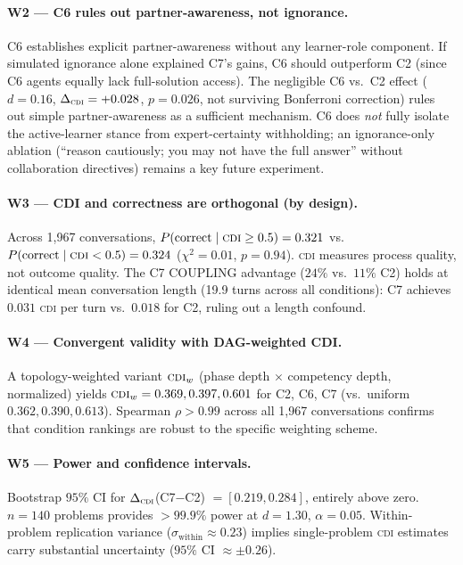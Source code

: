 \documentclass{article}
\newcommand{\CDI}{\textsc{cdi}}
\begin{document}
\paragraph{W2 — C6 rules out partner-awareness, not ignorance.}
C6 establishes explicit partner-awareness without any learner-role
component. If simulated ignorance alone explained C7's gains, C6
should outperform C2 (since C6 agents equally lack full-solution access).
The negligible C6 vs.\ C2 effect ($d=0.16$, $\Delta_{\CDI}=+0.028$,
$p=0.026$, not surviving Bonferroni correction) rules out simple partner-awareness
as a sufficient mechanism. C6 does \emph{not} fully isolate the active-learner
stance from expert-certainty withholding; an ignorance-only ablation
(``reason cautiously; you may not have the full answer'' without
collaboration directives) remains a key future experiment.

\paragraph{W3 — CDI and correctness are orthogonal (by design).}
Across 1,967 conversations, $P(\text{correct} \mid \CDI \geq 0.5)
= 0.321$ vs.\ $P(\text{correct} \mid \CDI < 0.5) = 0.324$
($\chi^2 = 0.01$, $p = 0.94$). \CDI{} measures process quality, not
outcome quality. The C7 COUPLING advantage ($24\%$ vs.\ $11\%$ C2)
holds at identical mean conversation length (19.9 turns across all
conditions): C7 achieves $0.031$ \CDI{} per turn vs.\ $0.018$ for C2,
ruling out a length confound.

\paragraph{W4 — Convergent validity with DAG-weighted CDI.}
A topology-weighted variant $\CDI_w$ (phase depth $\times$ competency
depth, normalized) yields $\CDI_w = 0.369, 0.397, 0.601$ for C2, C6,
C7 (vs.\ uniform $0.362, 0.390, 0.613$). Spearman $\rho > 0.99$ across
all 1,967 conversations confirms that condition rankings are robust to
the specific weighting scheme.

\paragraph{W5 — Power and confidence intervals.}
Bootstrap $95\%$ CI for $\Delta_\CDI$(C7$-$C2) $= [0.219, 0.284]$,
entirely above zero. $n=140$ problems provides $>99.9\%$ power at
$d=1.30$, $\alpha=0.05$. Within-problem replication variance
($\sigma_{\text{within}} \approx 0.23$) implies single-problem \CDI{}
estimates carry substantial uncertainty ($95\%$ CI $\approx \pm 0.26$).
\end{document}
